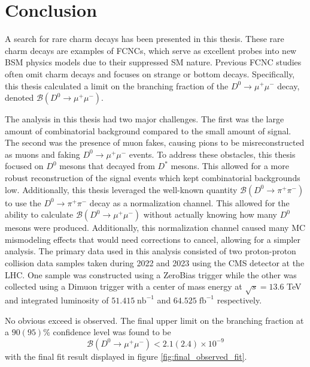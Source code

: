 \chapter{Conclusion}
\label{ch:5}

\vspace{-5mm}

A search for rare charm decays has been presented in this thesis. These rare charm decays are examples of FCNCs, which serve as excellent probes into new BSM physics models due to their suppressed SM nature. Previous FCNC studies often omit charm decays and focuses on strange or bottom decays. Specifically, this thesis calculated a limit on the branching fraction of the $D^0 \to \mu^+ \mu^-$ decay, denoted $\mathcal{B}(D^0 \to \mu^+ \mu^-)$. 

The analysis in this thesis had two major challenges. The first was the large amount of combinatorial background compared to the small amount of signal. The second was the presence of muon fakes, causing pions to be misreconstructed as muons and faking $D^0 \to \mu^+ \mu^-$ events. To address these obstacles, this thesis focused on $D^0$ mesons that decayed from $D^*$ mesons. This allowed for a more robust reconstruction of the signal events which kept combinatorial backgrounds low. Additionally, this thesis leveraged the well-known quantity $\mathcal{B}(D^0 \to \pi^+ \pi^-)$ to use the $D^0 \to \pi^+ \pi^-$ decay as a normalization channel. This allowed for the ability to calculate $\mathcal{B}(D^0 \to \mu^+ \mu^-)$ without actually knowing how many $D^0$ mesons were produced. Additionally, this normalization channel caused many MC mismodeling effects that would need corrections to cancel, allowing for a simpler analysis. The primary data used in this analysis consisted of two proton-proton collision data samples taken during 2022 and 2023 using the CMS detector at the LHC. One sample was constructed using a ZeroBias trigger while the other was collected using a Dimuon trigger with a center of mass energy at $\sqrt{s} = 13.6$ TeV and integrated luminosity of $51.415\; \text{nb}^{-1}$ and $64.525\; \text{fb}^{-1}$ respectively. 

No obvious exceed is observed. The final upper limit on the branching fraction at a $90(95)\%$ confidence level was found to be 
\begin{equation}
    \mathcal{B}(D^0 \to \mu^+ \mu^-) < 2.1(2.4) \times 10^{-9} 
\end{equation}
with the final fit result displayed in figure \ref{fig:final_observed_fit}. 

